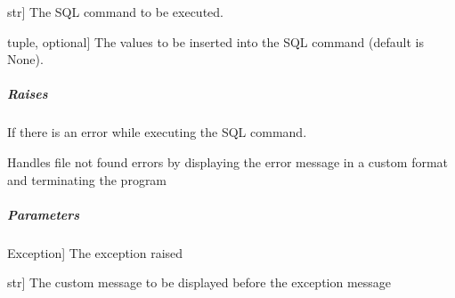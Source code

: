 \documentclass[letterpaper,10pt,english]{sphinxmanual}
\begin{document}
\begin{fulllineitems}
\begin{fulllineitems}
\begin{description}
\sphinxlineitem{sql}{[}str{]}
\sphinxAtStartPar
The SQL command to be executed.

\sphinxlineitem{values}{[}tuple, optional{]}
\sphinxAtStartPar
The values to be inserted into the SQL command (default is None).

\end{description}


\subparagraph{Raises}
\label{\detokenize{main.error_handler:raises}}\begin{description}
\sphinxAtStartPar
If there is an error while executing the SQL command.

\end{description}

\end{fulllineitems}


\begin{fulllineitems}
\label{\detokenize{main.error_handler:main.error_handler.error_handler.ErrorHandler.handle_file_not_found_error}}
\pysigstartsignatures
{}
\pysigstopsignatures
\sphinxAtStartPar
Handles file not found errors by displaying the error message in a custom format and terminating the program


\subparagraph{Parameters}
\label{\detokenize{main.error_handler:id1}}\begin{description}
\sphinxlineitem{e}{[}Exception{]}
\sphinxAtStartPar
The exception raised

\sphinxlineitem{custom\_message}{[}str{]}
\sphinxAtStartPar
The custom message to be displayed before the exception message

\end{description}

\end{fulllineitems}



\end{fulllineitems}
\end{document}
